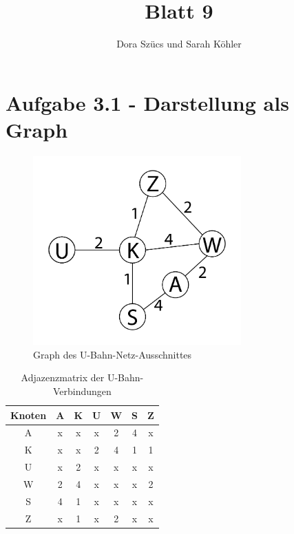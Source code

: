 \documentclass[12pt]{amsart}
\title{Blatt 9}
\author{Dora Szücs und Sarah Köhler}
\begin{document}
\maketitle

\section*{Aufgabe 3.1 - Darstellung als Graph}

\begin{figure}[h] %
   \centering
   \includegraphics[width=8cm]{graph.png} 
   \caption{Graph des U-Bahn-Netz-Ausschnittes}
   \label{fig:example}
\end{figure}



\begin{table}[h]
   \centering
   \begin{tabular}{@{} ccccccc @{}} %
      \toprule
      	Knoten & A & K &U & W & S & Z \\
      \midrule
      	A  & x & x & x & 2 & 4 & x \\
	K & x & x & 2 & 4  & 1 & 1 \\
	U  & x &  2 &x &  x &  x& x \\
	W  &  2 & 4 &x &x &x  &  2\\
	S  & 4 & 1 &x & x &  x& x \\
	Z  &  x& 1 & x& 2 & x & x \\

      \bottomrule
   \end{tabular}
   \caption{Adjazenzmatrix der U-Bahn-Verbindungen}
   \label{tab:booktabs}
\end{table}
\end{document}
